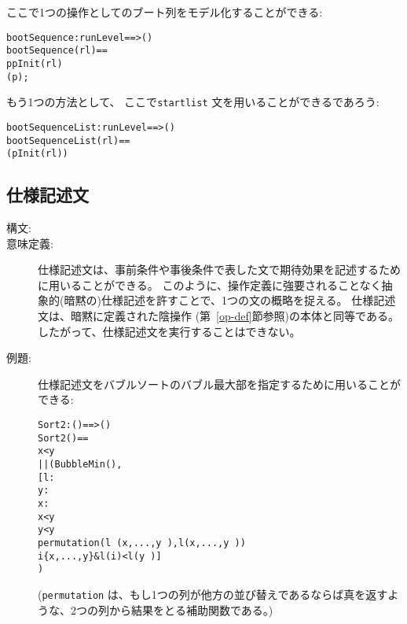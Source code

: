 \documentclass[\pformat,12pt]{jarticle}
\begin{document}
\begin{description}
ここで1つの操作としてのブート列をモデル化することができる:
\begin{alltt}
    bootSequence : runLevel ==> ()
    bootSequence(rl) ==
       p  pInit(rl) 
        (p);
\end{alltt}
もう1つの方法として、 ここで\texttt{startlist} 文を用いることができるであろう:
\begin{alltt}
    bootSequenceList : runLevel ==> ()
    bootSequenceList(rl) ==
      (pInit(rl))
\end{alltt}
\end{description}

\subsection{仕様記述文} \label{se:specification}

\begin{description}
\item[構文:] 

\item[意味定義:] 

仕様記述文は、事前条件や事後条件で表した文で期待効果を記述するために用いることができる。
このように、操作定義に強要されることなく抽象的(暗黙の)仕様記述を許すことで、1つの文の概略を捉える。
仕様記述文は、暗黙に定義された陰操作 (第~\ref{op-def}節参照)の本体と同等である。したがって、仕様記述文を実行することはできない。

\item[例題:]  仕様記述文をバブルソートのバブル最大部を指定するために用いることができる:
  \begin{alltt}
  Sort2 : () ==> ()
  Sort2 () ==
     x < y 
      || (BubbleMin(),
          [ l : 
               y : 
               x : 
            x < y
            y < y~ 
                permutation (l~(x,...,y~),l(x,...,y~)) 
                 i  \{x,...,y\} & l(i) < l(y~)]
         )
  \end{alltt}
 (\texttt{permutation} は、もし1つの列が他方の並び替えであるならば真を返すような、2つの列から結果をとる補助関数である。)


\end{description}
\end{document}
